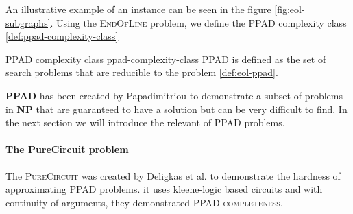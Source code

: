 An illustrative example of an instance can be seen in the figure \ref{fig:eol-subgraphs}. 
Using the \textsc{EndOfLine} problem, we define the
\textsc{PPAD} complexity class \ref{def:ppad-complexity-class}


\begin{definitionbox}{\textsc{PPAD} complexity class \cite{papadimitriou_ComplexityParityArgument_1994}}{ppad-complexity-class}
    \textsc{PPAD} is defined as the set of search problems that
    are reducible to the  problem \ref{def:eol-ppad}.
\end{definitionbox}

\textbf{PPAD} has been created by Papadimitriou \cite{papadimitriou_ComplexityParityArgument_1994}
to demonstrate a subset of problems in \textbf{NP} that are guaranteed to have
a solution but can be very difficult to find. In the next section
we will introduce the relevant of \textsc{PPAD} problems.

\paragraph{The PureCircuit problem}
\label{par:pure-circ-def}

The  \textsc{PureCircuit} was created by Deligkas et al. \cite{deligkas_PureCircuitTightInapproximability_2024}
to demonstrate the hardness of approximating \textsc{PPAD} problems.
it uses kleene-logic based circuits and with continuity of arguments, they demonstrated \textsc{PPAD-completeness}.

